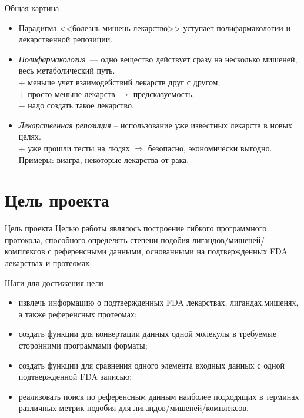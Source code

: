 \documentclass[14pt]{beamer}
\begin{document}
\begin{frame}{Общая картина}
	\begin{itemize}
		\normalsize
		\item Парадигма <<болезнь-мишень-лекарство>> уступает полифармакологии и лекарственной репозиции.
		\small
		\item \textit{Полифармакология}~--- одно вещество действует сразу на несколько мишеней, весь метаболический путь.\\
		$+$ меньше учет взаимодействий лекарств друг с другом;\\
		$+$ просто меньше лекарств $\rightarrow$ предсказуемость;\\
		$-$ надо создать такое лекарство.\\
		\item \textit{Лекарственная репозиция} – использование уже известных лекарств в новых целях.\\ 
		$+$ уже прошли тесты на людях $\Rightarrow$ безопасно, экономически выгодно.\\
		Примеры: виагра, некоторые лекарства от рака.
	\end{itemize}
\end{frame}

\section{Цель проекта}
\begin{frame}{Цель проекта}
	\linespread{1.35}
	\centering
    Целью работы являлось построение гибкого программного протокола, способного определять степени подобия лигандов/мишеней/комплексов с референсными данными, основанными на подтвержденных FDA лекарствах и протеомах.
	\small
\end{frame}

\begin{frame}{Шаги для достижения цели}	
	\begin{itemize}
		\item извлечь информацию о подтвержденных FDA лекарствах, лигандах,мишенях, а также референсных протеомах;
		\item создать функции для конвертации данных одной молекулы в требуемые сторонними программами форматы;
		\item создать функции для сравнения одного элемента входных данных с одной подтвержденной FDA записью;
		\item реализовать поиск по референсным данным наиболее подходящих в терминах различных метрик подобия для лигандов/мишеней/комплексов.
	\end{itemize}
\end{frame}
\end{document}
